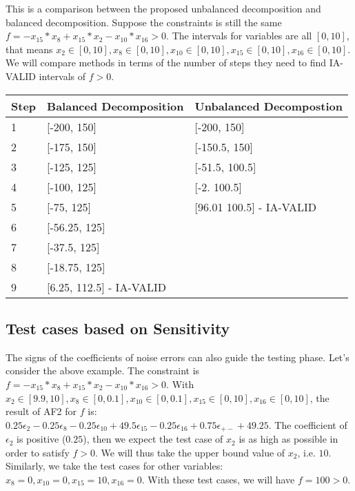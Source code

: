 \documentclass[12pt]{article}
\begin{document}
This is a comparison between the proposed unbalanced decomposition and balanced decomposition. Suppose the constraints is still the same $f = -x_{15}*x_8+x_{15}*x_2-x_{10}*x_{16}>0$. The intervals for variables are all $[0, 10]$, that means $x_2 \in [0, 10], x_8 \in [0, 10], x_{10} \in [0, 10], x_{15} \in [0, 10], x_{16} \in [0, 10]$. We will compare methods in terms of the number of steps they need to find IA-VALID intervals of $f>0$.
\begin{center}
    \begin{tabular}{ | l | l | l | }
    \hline
    Step & Balanced Decomposition & Unbalanced Decompostion\\ \hline
    1 & [-200, 150] & [-200, 150] \\ \hline
    2 &  [-175, 150] & [-150.5, 150] \\ \hline
    3 & [-125, 125] & [-51.5, 100.5] \\ \hline
    4 &  [-100, 125] & [-2. 100.5] \\ \hline
    5 &  [-75, 125] & [96.01 100.5] - IA-VALID \\ \hline 
    6 &  [-56.25, 125] &  \\ \hline
    7 &  [-37.5, 125] & \\ \hline
    8 &  [-18.75, 125] & \\ \hline
    9 &  [6.25, 112.5] - IA-VALID &  \\ \hline
    \end{tabular}
\end{center}

\subsection{Test cases based on Sensitivity}
\label{subsec:testBasedSen}
The signs of the coefficients of noise errors can also guide the testing phase. Let's consider the above example. The constraint is $f = -x_{15}*x_8+x_{15}*x_2-x_{10}*x_{16}>0$. With $x_2 \in [9.9, 10], x_8 \in [0, 0.1], x_{10} \in [0, 0.1], x_{15} \in [0, 10], x_{16} \in [0, 10]$, the result of AF2 for $f$ is: $0.25 \epsilon_2 - 0.25 \epsilon_8 - 0.25 \epsilon_{10} + 49.5\epsilon_{15} - 0.25\epsilon_{16} + 0.75\epsilon_{+-} + 49.25$. The coefficient of $\epsilon_2$ is positive ($0.25$), then we expect the test case of $x_2$ is as high as possible in order to satisfy $f>0$. We will thus take the upper bound value of $x_2$, i.e. $10$. Similarly, we take the test cases for other variables: $x_8=0, x_{10}=0, x_{15}=10, x_{16}=0$. With these test cases, we will have $f=100 > 0$.
\end{document}
